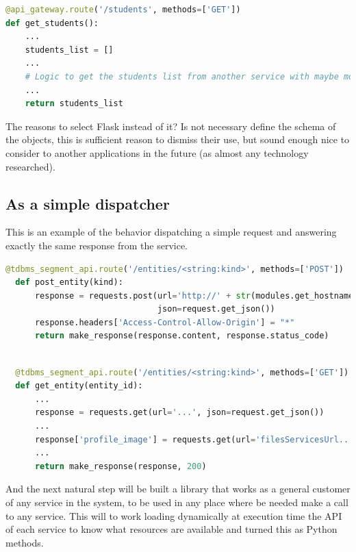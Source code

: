 \begin{lstlisting}[language=python,frame=none]
@api_gateway.route('/students', methods=['GET'])
def get_students():
    ...
    students_list = []
    ...
    # Logic to get the students list from another service with maybe more logic.
    ...
    return students_list
\end{lstlisting}

\noindent The reasons to select Flask instead of it?
Is not necessary define the schema of the objects, this is sufficient reason
to dismiss their use, but sound enough nice to consider to another
applications in the future (as almost any technology researched).


\subsection{As a simple dispatcher}

This is an example of the behavior dispatching a simple request and answering
exactly the same response from the service.

\begin{lstlisting}[language=python,frame=none]
  @tdbms_segment_api.route('/entities/<string:kind>', methods=['POST'])
  def post_entity(kind):
      response = requests.post(url='http://' + str(modules.get_hostname(module='tdbms')) + '/entities/' + str(kind),
                               json=request.get_json())
      response.headers['Access-Control-Allow-Origin'] = "*"
      return make_response(response.content, response.status_code)
\end{lstlisting}


\begin{lstlisting}[language=python,frame=none]

  @tdbms_segment_api.route('/entities/<string:kind>', methods=['GET'])
  def get_entity(entity_id):
      ...
      response = requests.get(url='...', json=request.get_json())
      ...
      response['profile_image'] = requests.get(url='filesServicesUrl...')
      ...
      return make_response(response, 200)
\end{lstlisting}

\noindent And the next natural step will be built a library that works as a general
customer of any service in the system, to be used in any place where be needed
make a call to any service. This will to work loading dynamically at execution
time the API of each service to know what resources are available and turned
this as Python methods.


